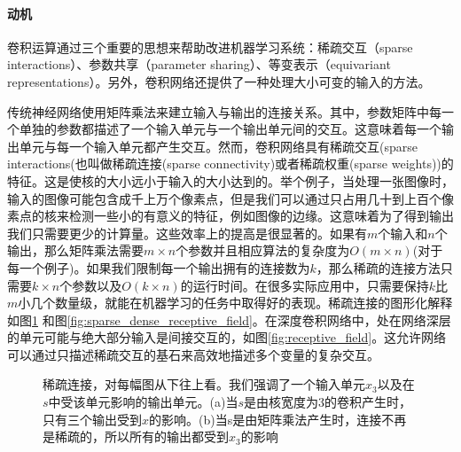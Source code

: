 \documentclass[12pt,a4paper,titlepage]{article}
\begin{document}
\paragraph{动机}
卷积运算通过三个重要的思想来帮助改进机器学习系统：稀疏交互（sparse interactions）、参数共享（parameter sharing）、等变表示（equivariant representations）。另外，卷积网络还提供了一种处理大小可变的输入的方法。\par
传统神经网络使用矩阵乘法来建立输入与输出的连接关系。其中，参数矩阵中每一个单独的参数都描述了一个输入单元与一个输出单元间的交互。这意味着每一个输出单元与每一个输入单元都产生交互。然而，卷积网络具有稀疏交互(sparse interactions(也叫做稀疏连接(sparse connectivity)或者稀疏权重(sparse weights))的特征。这是使核的大小远小于输入的大小达到的。举个例子，当处理一张图像时，输入的图像可能包含成千上万个像素点，但是我们可以通过只占用几十到上百个像素点的核来检测一些小的有意义的特征，例如图像的边缘。这意味着为了得到输出我们只需要更少的计算量。这些效率上的提高是很显著的。如果有$m$个输入和$n$个输出，那么矩阵乘法需要$m \times n$个参数并且相应算法的复杂度为$O(m \times n)$(对于每一个例子)。如果我们限制每一个输出拥有的连接数为$k$，那么稀疏的连接方法只需要$k \times n$个参数以及$O(k\times n)$的运行时间。在很多实际应用中，只需要保持$k$比$m$小几个数量级，就能在机器学习的任务中取得好的表现。稀疏连接的图形化解释如图\ref{fig:sparse_dense} 和图\ref{fig:sparse_dense_receptive_field}。在深度卷积网络中，处在网络深层的单元可能与绝大部分输入是间接交互的，如图\ref{fig:receptive_field}。这允许网络可以通过只描述稀疏交互的基石来高效地描述多个变量的复杂交互。

\begin{figure}[htbp] %

\centering




\caption{稀疏连接，对每幅图从下往上看。我们强调了一个输入单元$x_3$以及在$s$中受该单元影响的输出单元。(a)当$s$是由核宽度为3的卷积产生时，只有三个输出受到$x$的影响。(b)当s是由矩阵乘法产生时，连接不再是稀疏的，所以所有的输出都受到$x_3$的影响}
\label{fig:sparse_dense}
\end{figure}
\end{document}
